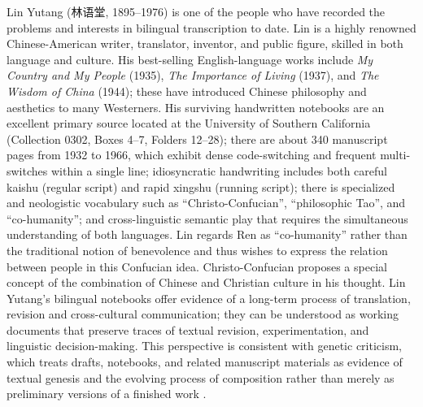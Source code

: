 \documentclass[final]{anthology-ch} %
\begin{document}
Lin Yutang (林语堂, 1895--1976) is one of the people who have recorded the problems and interests in bilingual transcription to date. Lin is a highly renowned Chinese-American writer, translator, inventor, and public figure, skilled in both language and culture. His best-selling English-language works include \textit{My Country and My People} (1935), \textit{The Importance of Living} (1937), and \textit{The Wisdom of China} (1944); these have introduced Chinese philosophy and aesthetics to many Westerners. His surviving handwritten notebooks are an excellent primary source located at the University of Southern California (Collection 0302, Boxes 4--7, Folders 12--28); there are about 340 manuscript pages from 1932 to 1966, which exhibit dense code-switching and frequent multi-switches within a single line; idiosyncratic handwriting includes both careful kaishu (regular script) and rapid xingshu (running script); there is specialized and neologistic vocabulary such as \enquote{Christo-Confucian}, \enquote{philosophic Tao}, and \enquote{co-humanity}; and cross-linguistic semantic play that requires the simultaneous understanding of both languages. Lin regards Ren as \enquote{co-humanity} rather than the traditional notion of benevolence and thus wishes to express the relation between people in this Confucian idea. Christo-Confucian proposes a special concept of the combination of Chinese and Christian culture in his thought. Lin Yutang's bilingual notebooks offer evidence of a long-term process of translation, revision and cross-cultural communication; they can be understood as working documents that preserve traces of textual revision, experimentation, and linguistic decision-making. This perspective is consistent with genetic criticism, which treats drafts, notebooks, and related manuscript materials as evidence of textual genesis and the evolving process of composition rather than merely as preliminary versions of a finished work \cite{deppman2004genetic}.
\end{document}

